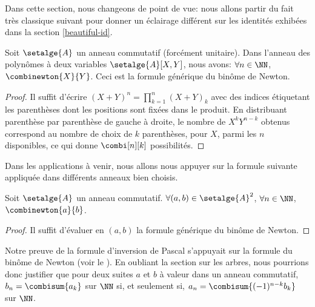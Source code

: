 Dans cette section, nous changeons de point de vue: nous allons partir du fait très classique suivant pour donner un éclairage différent sur les identités exhibées dans la section \ref{beautiful-id}.




\begin{fact} \label{bino-id-formal}
	Soit $\setalge{A}$ un anneau commutatif (forcément unitaire).
	Dans l'anneau des polynômes à deux variables $\setalge{A}[X, Y]$, nous avons:
	$\forall n \in \NN$,
	$\combinewton{X}{Y}$.
	Ceci est la formule générique du binôme de Newton.
\end{fact}


\begin{proof}
	Il suffit d'écrire $(X + Y)^n = \prod_{k=1}^{n} (X + Y)_k$ avec des indices étiquetant les parenthèses dont les positions sont fixées dans le produit.
    En distribuant parenthèse par parenthèse de gauche à droite, le nombre de $X^k Y^{n-k}$ obtenus correspond au nombre de choix de $k$ parenthèses, pour $X$, parmi les $n$ disponibles, ce qui donne $\combi[n][k]$ possibilités.
\end{proof}




Dans les applications à venir, nous allons nous appuyer sur la formule suivante appliquée dans différents anneaux bien choisis.


\begin{fact} \label{bino-id-a-b}
	Soit $\setalge{A}$ un anneau commutatif.
	$\forall (a, b) \in \setalge{A}^2$,
	$\forall n \in \NN$,
	$\combinewton{a}{b}$.
\end{fact}


\begin{proof}
	Il suffit d'évaluer en $(a, b)$ la formule générique du binôme de Newton.
\end{proof}




\begin{remark}
	Notre preuve de la formule d'inversion de Pascal s'appuyait sur la formule du binôme de Newton (voir le ).
	En oubliant la section sur les arbres, nous pourrions donc justifier que pour deux suites $a$ et $b$ à valeur dans un anneau commutatif,
	$b_n = \combisum{a_k}$ sur $\NN$
	si, et seulement si,
	$a_n = \combisum{(-1)^{n-k} b_k}$ sur $\NN$.
\end{remark}

